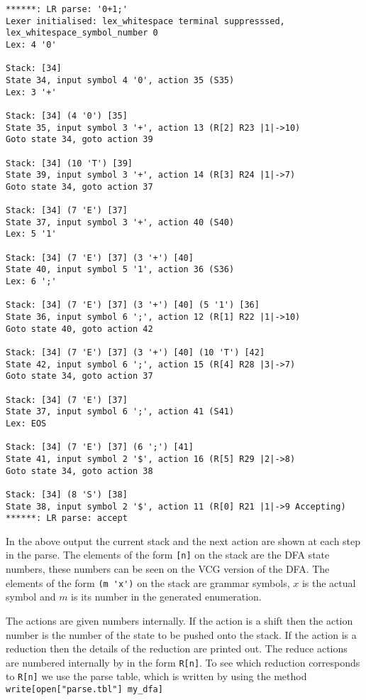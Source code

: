 {\small
\begin{verbatim}
******: LR parse: '0+1;'
Lexer initialised: lex_whitespace terminal suppresssed, 
lex_whitespace_symbol_number 0
Lex: 4 '0'

Stack: [34] 
State 34, input symbol 4 '0', action 35 (S35)
Lex: 3 '+'

Stack: [34] (4 '0') [35] 
State 35, input symbol 3 '+', action 13 (R[2] R23 |1|->10)
Goto state 34, goto action 39

Stack: [34] (10 'T') [39] 
State 39, input symbol 3 '+', action 14 (R[3] R24 |1|->7)
Goto state 34, goto action 37

Stack: [34] (7 'E') [37] 
State 37, input symbol 3 '+', action 40 (S40)
Lex: 5 '1'

Stack: [34] (7 'E') [37] (3 '+') [40] 
State 40, input symbol 5 '1', action 36 (S36)
Lex: 6 ';'

Stack: [34] (7 'E') [37] (3 '+') [40] (5 '1') [36] 
State 36, input symbol 6 ';', action 12 (R[1] R22 |1|->10)
Goto state 40, goto action 42

Stack: [34] (7 'E') [37] (3 '+') [40] (10 'T') [42] 
State 42, input symbol 6 ';', action 15 (R[4] R28 |3|->7)
Goto state 34, goto action 37

Stack: [34] (7 'E') [37] 
State 37, input symbol 6 ';', action 41 (S41)
Lex: EOS

Stack: [34] (7 'E') [37] (6 ';') [41] 
State 41, input symbol 2 '$', action 16 (R[5] R29 |2|->8)
Goto state 34, goto action 38

Stack: [34] (8 'S') [38] 
State 38, input symbol 2 '$', action 11 (R[0] R21 |1|->9 Accepting)
******: LR parse: accept
\end{verbatim} 
} 

In the above output
the current stack and the next action are shown at
each step in the parse. The elements of the form \verb+[n]+
on the stack are the DFA state
numbers, these numbers can be seen on the VCG version of the DFA.
The elements of the form \verb+(m 'x')+ on the stack
are grammar symbols, $x$ is the
actual symbol and $m$ is its number in the \gtb generated enumeration.

The actions are given numbers internally. If the action is a shift
then the action number is the number of the state to be pushed onto
the stack. If the action is a reduction then the details of the
reduction are printed out. The reduce actions are numbered internally
by \gtb in the form \verb+R[n]+. To see which reduction corresponds to 
\verb+R[n]+ we use the parse table, which is written by \gtb using the 
method \verb+write[open["parse.tbl"] my_dfa]+


